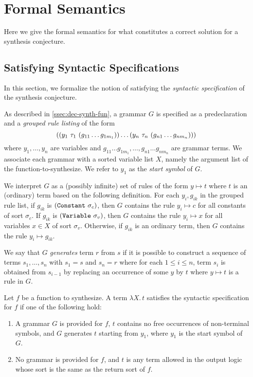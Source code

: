 \documentclass[english,a4paper,10pt]{article}
\begin{document}
\section{Formal Semantics}
\label{sec:logical-semantics}

Here we give the formal semantics
for what constitutes a correct solution for a synthesis conjecture.

\subsection{Satisfying Syntactic Specifications}
\label{ssec:sat-syntactic}

In this section,
we formalize the notion of satisfying the \emph{syntactic specification}
of the synthesis conjecture.

As described in \cref{ssec:dec-synth-fun},
a grammar $G$ is specified as a predeclaration and
a \emph{grouped rule listing} of the form
\[
{\tt (}{\tt (}y_1\mbox{ }\tau_1\mbox{ }{\tt (}g_{11} \ldots g_{1m_1} {\tt )} {\tt )} \ldots 
{\tt (}y_n\mbox{ }\tau_n\mbox{ }{\tt (}g_{n1} \ldots g_{nm_n} {\tt )} {\tt )}{\tt )}
\]
where $y_1, \ldots, y_n$ are variables
and $g_{11} \ldots g_{1m_1}, \ldots, g_{n1} \ldots g_{nm_n}$
are grammar terms.
We associate each grammar with a sorted variable list $X$,
namely the argument list of the function-to-synthesize.
We refer to $y_1$ as the \emph{start symbol} of $G$.

We interpret $G$ as a (possibly infinite) set of rules 
of the form $y \mapsto t$ where $t$ is an (ordinary) term
based on the following definition.
For each $y_i, g_{ik}$ in the grouped rule list,
if $g_{ik}$ is ${\tt (}{\tt Constant}\mbox{ }\sigma_c{\tt )}$,
then $G$ contains the rule $y_i \mapsto c$ for all constants of sort $\sigma_c$.
If $g_{ik}$ is ${\tt (}{\tt Variable}\mbox{ }\sigma_v{\tt )}$,
then $G$ contains the rule $y_i \mapsto x$
for all variables $x \in X$ of sort $\sigma_v$.
Otherwise, if $g_{ik}$ is an ordinary term,
then $G$ contains the rule $y_i \mapsto g_{ik}$.

We say that $G$ \emph{generates} term $r$ from $s$
if it is possible to construct a sequence of terms
$s_1, \ldots, s_n$
with $s_1 = s$ and $s_n = r$
where for each $1 \leq i \leq n$, term $s_i$ is obtained from $s_{i-1}$ by
replacing an occurrence of some $y$ by $t$
where $y \mapsto t$ is a rule in $G$.

Let $f$ be a function to synthesize.
A term $\lambda X.\, t$
satisfies the syntactic specification for $f$
if one of the following hold:
\begin{enumerate}
\item 
A grammar $G$ is provided for $f$,
$t$ contains no free occurrences of non-terminal symbols,
and $G$ generates $t$ starting from $y_1$,
where $y_1$ is the start symbol of $G$.

\item
No grammar is provided for $f$, and $t$ is any
term allowed in the output logic whose sort
is the same as the return sort of $f$.
\end{enumerate}
\end{document}
